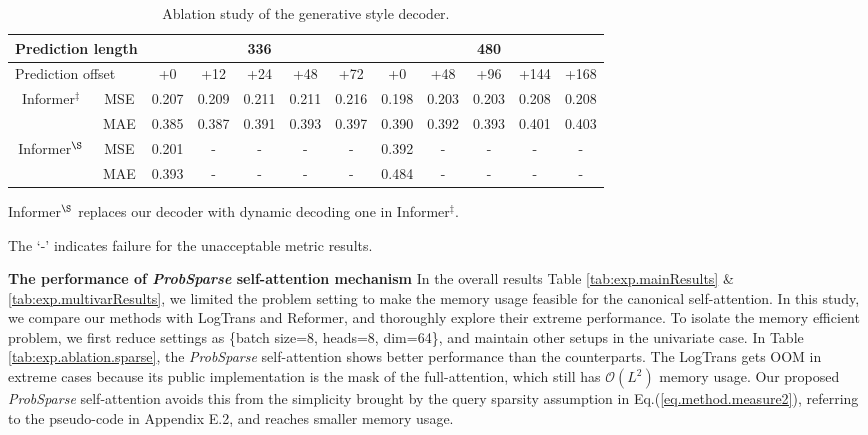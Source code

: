 \documentclass[letterpaper]{article} %
\newcommand{\bigO}{\mathcal{O}}
\newcommand{\mn}{Informer}
\begin{document}
\begin{table}[t]
\centering
\fontsize{9pt}{9pt}\selectfont
\begin{threeparttable}
\begin{tabular}{cc|ccccc|ccccc}
\toprule[1.0pt]
\multicolumn{2}{l|}{Prediction length} & \multicolumn{5}{c|}{336} & \multicolumn{5}{c}{480}  \\
\midrule[0.5pt]
\multicolumn{2}{l|}{Prediction offset} & +0 & +12 & +24 & +48 & +72 & +0 & +48 & +96 & +144 & +168 \\ \midrule[1.0pt]
\multirow{2}{*}{\mn$^{\ddag}$} & MSE & 0.207 & 0.209 & 0.211 & 0.211 & 0.216 & 0.198 & 0.203 & 0.203 & 0.208 & 0.208 \\
                     & MAE & 0.385 & 0.387 & 0.391 & 0.393 & 0.397 & 0.390 & 0.392 & 0.393 & 0.401 & 0.403\\
\midrule[0.5pt]
\multirow{2}{*}{\mn$^{\S}$} & MSE & 0.201 & - & - & - & - & 0.392 & - & - & - & - \\
                     & MAE & 0.393 & - & - & - & - & 0.484 & - & - & - & - \\
\bottomrule[1.0pt]
\end{tabular}
\begin{tablenotes}
\item[1] \mn$^{\S}$ replaces our decoder with dynamic decoding one in \mn$^{\ddag}$.
\item[2] The `-' indicates failure for the unacceptable metric results.
\end{tablenotes}
\end{threeparttable}
\caption{Ablation study of the generative style decoder.}
\label{tab:exp.ablation.decoder}
\vspace{-1 ex}
\end{table}


\textbf{The performance of \emph{ProbSparse} self-attention mechanism}
In the overall results Table \ref{tab:exp.mainResults} \& \ref{tab:exp.multivarResults}, we limited the problem setting to make the memory usage feasible for the canonical self-attention.
In this study, we compare our methods with LogTrans and Reformer, and thoroughly explore their extreme performance.
To isolate the memory efficient problem, we first reduce settings as \{batch size=8, heads=8, dim=64\}, and maintain other setups in the univariate case. %
In Table \ref{tab:exp.ablation.sparse}, the \emph{ProbSparse} self-attention shows better performance than the counterparts. The LogTrans gets OOM in extreme cases because its public implementation is the mask of the full-attention, which still has $\bigO(L^2)$ memory usage. Our proposed \emph{ProbSparse} self-attention avoids this from the simplicity brought by the query sparsity assumption in Eq.(\ref{eq.method.measure2}), referring to the pseudo-code in Appendix E.2, and reaches smaller memory usage.
\end{document}
